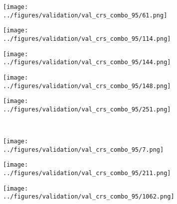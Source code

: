 \begin{figure}[h!]
			\begin{subfigure}[b]{0.03\textwidth} %
		\centering
	\end{subfigure}
	\hspace{0.05cm}
	\begin{subfigure}{0.18\textwidth}
		\centering
		\texttt{[image: ../figures/validation/val\_crs\_combo\_95/61.png]}
		\label{fig:1}
	\end{subfigure}
	\begin{subfigure}{0.18\textwidth}
		\centering
		\texttt{[image: ../figures/validation/val\_crs\_combo\_95/114.png]}
		\label{fig:1}
	\end{subfigure}
	\begin{subfigure}{0.18\textwidth}
		\centering
		\texttt{[image: ../figures/validation/val\_crs\_combo\_95/144.png]}
		\label{fig:1}
	\end{subfigure}
	\begin{subfigure}{0.18\textwidth}
		\centering
		\texttt{[image: ../figures/validation/val\_crs\_combo\_95/148.png]}
		\label{fig:1}
	\end{subfigure}
	\begin{subfigure}{0.18\textwidth}
		\centering
		\texttt{[image: ../figures/validation/val\_crs\_combo\_95/251.png]}
		\label{fig:1}
	\end{subfigure}
	\vspace{-0.35cm}
	\\
			\begin{subfigure}[b]{0.03\textwidth} %
		\centering
	\end{subfigure}
	\hspace{0.05cm}
	\begin{subfigure}{0.18\textwidth}
		\centering
		\texttt{[image: ../figures/validation/val\_crs\_combo\_95/7.png]}
		\label{fig:1}
	\end{subfigure}
	\begin{subfigure}{0.18\textwidth}
		\centering
		\texttt{[image: ../figures/validation/val\_crs\_combo\_95/211.png]}
		\label{fig:1}
	\end{subfigure}
	\begin{subfigure}{0.18\textwidth}
		\centering
		\texttt{[image: ../figures/validation/val\_crs\_combo\_95/1062.png]}

\end{subfigure}
\end{figure}
